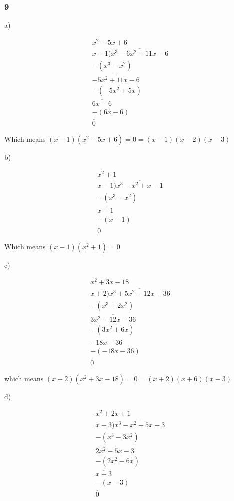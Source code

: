 \documentclass[]{report}
\begin{document}
\subsubsection{9}

a) 

\begin{align*}
x^2  -5x + 6\\
x-1 ) \overline{x^3 - 6x^2 + 11x - 6}\\
- (x^3 -x^2)\\
\overline{-5x^2 + 11x - 6} \\
-(-5x^2 + 5x)\\
\overline{6x - 6}\\
-(6x -6) \\
\overline{0}
\end{align*}

Which means $(x-1)(x^2  -5x + 6) = 0 = (x-1)(x - 2)(x - 3)$

b)

\begin{align*}
x^2 + 1\\
x-1) \overline{x^3 -x^2 + x - 1}\\
-(x^3 -x^2)\\
\overline{x - 1}\\
- (x - 1)\\
\overline{0}
\end{align*}

Which means $(x-1)(x^2 + 1) = 0$

c)

\begin{align*}
x^2 + 3x - 18\\
x + 2) \overline{x^3 + 5x^2  - 12x -36}\\
- (x^3 +2x^2)\\
\overline{3x^2 - 12x -36}\\
-(3x^2 + 6x)\\
\overline{-18x - 36}\\
-(-18x - 36) \\
\overline{0}
\end{align*}

which means $(x+2)(x^2 + 3x - 18) = 0 = (x+2)(x+6)(x-3)$

d)

\begin{align*}
x^2 + 2x +  1\\
x-3) \overline{x^3 - x^2 - 5x - 3}\\
- (x^3 -3x^2)\\
\overline{2x^2 - 5x - 3}\\
- (2x^2 - 6x)\\
\overline{x - 3}\\
- (x - 3)\\
\overline{0}
\end{align*}
\end{document}
